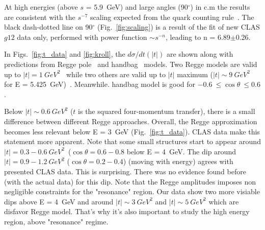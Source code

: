 \documentclass[aps,prc,onecolumn,floatfix,showpacs,preprintnumbers,amsmath,amssymb,superscriptaddress]{revtex4-1}
\begin{document}
At high energies (above $s$ = 5.9~GeV) and large angles 
(90$^\circ$) in c.m the results are consistent with the 
$s^{-7}$ scaling expected from the quark counting 
rule~\cite{stan}. The black dash-dotted line on 90$^\circ$ 
(Fig.~\ref{fig:scaling}) is a result of the fit of new CLAS 
$g12$ data only, performed with power function $\sim s^{-n}$, 
leading to n = 6.89$\pm$0.26.

In Figs.~\ref{fig:t_data} and \ref{fig:kroll}, the 
$d\sigma/dt(|t|)$ are shown along with predictions from Regge 
pole~\cite{Goldstein,Laget,Mathieu,Donnachie} and 
handbag~\cite{Kroll} models. Two Regge models are valid up to
$|t|=1~GeV^2$~\cite{Mathieu,Donnachie} while two others are
valid up to $|t|$ maximum ($|t|\sim 9~GeV^2$ for E = 
5.425~GeV)~\cite{Goldstein,Laget}.  Meanwhile. handbag model
is good for $-0.6~\leq \cos\theta~\leq 0.6$.

Below $|t|\sim 0.6~GeV^2$ ($t$ is the squared four-momentum 
transfer), there is a small difference between different Regge 
approaches.  Overall, the Regge approximation becomes less 
relevant below E = 3~GeV (Fig.~\ref{fig:t_data}).  CLAS data 
make this statement more apparent.  Note that some small 
structures start to appear around $|t| = 0.3-0.6~GeV^2$~($\cos\theta 
= 0.6-0.8$ below E = 4~GeV.  The dip around $|t| = 0.9-1.2~GeV^2$ 
($\cos\theta = 0.2-0.4$) (moving with energy) agrees with presented 
CLAS data.  This is surprising.  There was no evidence found before 
(with the actual data) for this dip. Note that the Regge amplitudes 
imposes non negligible constraints for the "resonance" region.  Our 
data show two more visiable dips above E = 4~GeV and around $|t|\sim 
3~GeV^2$ and $|t|\sim 5~GeV^2$ which are disfavor Regge model.  
That's why it's also important to study the high energy region, 
above "resonance" regime.
\end{document}
